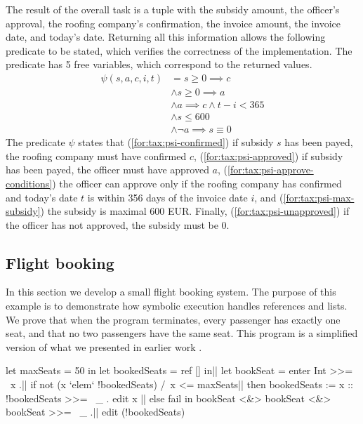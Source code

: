 The result of the overall task is a tuple with the subsidy amount, the officer's approval, the roofing company's confirmation, the invoice amount, the invoice date, and today's date.
Returning all this information allows the following predicate to be stated, which verifies the correctness of the implementation.
The predicate has 5 free variables, which correspond to the returned values.
\setcounter{equation}{0}
\begin{align}
\psi(s,a,c,i,t)
   & =      s \geq 0 \implies c \label{for:tax:psi-confirmed}
\\ & \wedge s \geq 0 \implies a \label{for:tax:psi-approved}
\\ & \wedge a \implies c \wedge t - i < 365 \label{for:tax:psi-approve-conditions}
\\ & \wedge s \leq 600 \label{for:tax:psi-max-subsidy}
\\ & \wedge \lnot a \implies s \equiv 0 \label{for:tax:psi-unapproved}
\end{align}
The predicate $\psi$ states that (\ref{for:tax:psi-confirmed}) if subsidy $s$ has been payed, the roofing company must have confirmed $c$, (\ref{for:tax:psi-approved}) if subsidy has been payed, the officer must have approved $a$, (\ref{for:tax:psi-approve-conditions}) the officer can approve only if the roofing company has confirmed and today's date $t$ is within 356 days of the invoice date $i$, and (\ref{for:tax:psi-max-subsidy}) the subsidy is maximal 600 EUR.
Finally, (\ref{for:tax:psi-unapproved}) if the officer has not approved, the subsidy must be 0.



\subsection{Flight booking}

In this section we develop a small flight booking system.
The purpose of this example is to demonstrate how symbolic execution handles references and lists.
We prove that when the program terminates, every passenger has exactly one seat, and that no two passengers have the same seat.
This program is a simplified version of what we presented in earlier work \cite{Steenvoorden2019}.

\begin{TASK}[float=ht
            ,numbers=right
            ,caption=Flight booking.
            ,label=lst:flight-booking
            ]
  let maxSeats = 50 in
  let bookedSeats = ref [] in|\label{lst:flight:make-ref}|
  let bookSeat = enter Int >>= \ x .|\label{lst:flight:enter-seat-number}|
    if not (x `elem` !bookedSeats) /\ x <= maxSeats|\label{lst:flight:guard-invalid-seats}|
      then bookedSeats := x :: !bookedSeats >>= \ _ . edit x |\label{lst:flight:update-seats}|
      else fail in
  bookSeat <&> bookSeat <&> bookSeat >>= \ _ .|\label{lst:flight:main-expression}|
  edit (!bookedSeats)
\end{TASK}

